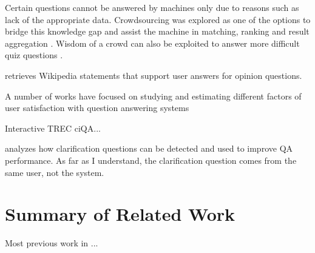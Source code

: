 Certain questions cannot be answered by machines only due to reasons such as lack of the appropriate data.
Crowdsourcing was explored as one of the options to bridge this knowledge gap and assist the machine in matching, ranking and result aggregation \cite{Franklin:2011:CAQ:1989323.1989331}.
Wisdom of a crowd can also be exploited to answer more difficult quiz questions \cite{aydin2014crowdsourcing}.

\cite{braunstain2016supporting} retrieves Wikipedia statements that support user answers for opinion questions.

A number of works have focused on studying and estimating different factors of user satisfaction with question answering systems \cite{ong2009measurement,Liu:2008:PIS:1390334.1390417}

Interactive TREC ciQA...

\cite{de2003analysis} analyzes how clarification questions can be detected and used to improve QA performance. As far as I understand, the clarification question comes from the same user, not the system.

\section{Summary of Related Work}

Most previous work in ...

\clearpage